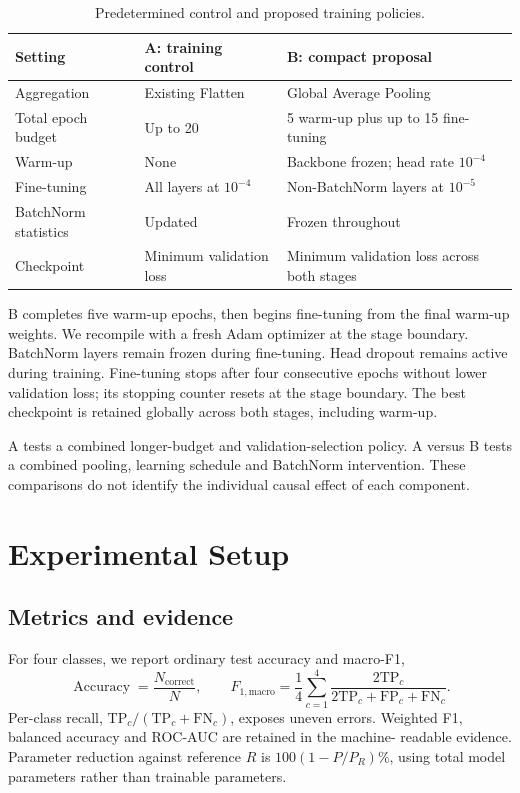 \documentclass[11pt,a4paper]{article}
\begin{document}
\begin{table}[tb]
\centering\small
\caption{Predetermined control and proposed training policies.}
\label{tab:methods}
\begin{tabularx}{\linewidth}{@{}lXX@{}}
\toprule
Setting & A: training control & B: compact proposal\\
\midrule
Aggregation & Existing Flatten & Global Average Pooling\\
Total epoch budget & Up to 20 & 5 warm-up plus up to 15 fine-tuning\\
Warm-up & None & Backbone frozen; head rate $10^{-4}$\\
Fine-tuning & All layers at $10^{-4}$ & Non-BatchNorm layers at $10^{-5}$\\
BatchNorm statistics & Updated & Frozen throughout\\
Checkpoint & Minimum validation loss & Minimum validation loss across both stages\\
\bottomrule
\end{tabularx}
\end{table}

B completes five warm-up epochs, then begins fine-tuning from the final warm-up
weights. We recompile with a fresh Adam optimizer at the stage boundary.
BatchNorm layers remain frozen during fine-tuning. Head dropout remains active
during training. Fine-tuning stops after four consecutive epochs without lower
validation loss; its stopping counter resets at the stage boundary. The best
checkpoint is retained globally across both stages, including warm-up.

A tests a combined longer-budget and validation-selection policy. A versus B
tests a combined pooling, learning schedule and BatchNorm intervention. These
comparisons do not identify the individual causal effect of each component.

\section{Experimental Setup}
\subsection{Metrics and evidence}
For four classes, we report ordinary test accuracy and macro-F1,
\begin{equation}
 \operatorname{Accuracy}=\frac{N_{\mathrm{correct}}}{N},\qquad
 F_{1,\mathrm{macro}}=\frac14\sum_{c=1}^{4}
 \frac{2\mathrm{TP}_c}{2\mathrm{TP}_c+\mathrm{FP}_c+\mathrm{FN}_c}.
\end{equation}
Per-class recall, $\mathrm{TP}_c/(\mathrm{TP}_c+\mathrm{FN}_c)$, exposes uneven
errors. Weighted F1, balanced accuracy and ROC-AUC are retained in the machine-
readable evidence. Parameter reduction against reference $R$ is
$100(1-P/P_R)\%$, using total model parameters rather than trainable parameters.
\end{document}
